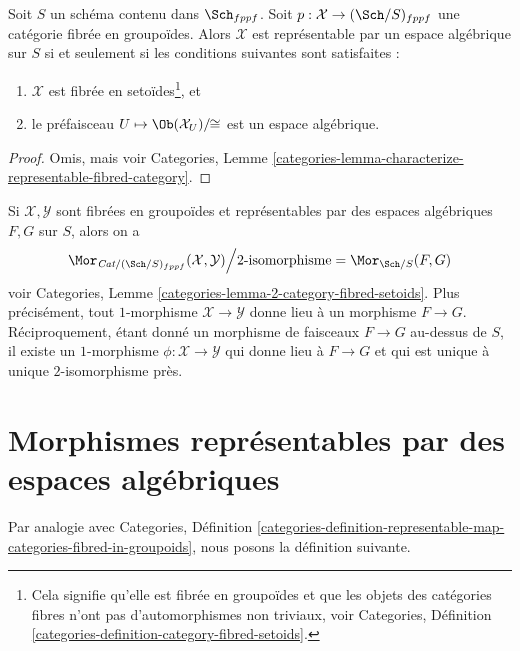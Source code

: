 \begin{lemma}
\label{lemma-characterize-representable-by-space}
Soit $S$ un schéma contenu dans $\Sch_{fppf}$.
Soit $p : \mathcal{X} \to (\Sch/S)_{fppf}$
une catégorie fibrée en groupoïdes.
Alors $\mathcal{X}$ est représentable par un espace algébrique sur $S$
si et seulement si les conditions suivantes sont satisfaites :
\begin{enumerate}
\item $\mathcal{X}$ est fibrée en setoïdes\footnote{Cela signifie qu'elle
est fibrée en groupoïdes et que les objets des catégories fibres
n'ont pas d'automorphismes non triviaux, voir Categories,
Définition \ref{categories-definition-category-fibred-setoids}.}, et
\item le préfaisceau $U \mapsto \Ob(\mathcal{X}_U)/\!\!\cong$ est
un espace algébrique.
\end{enumerate}
\end{lemma}

\begin{proof}
Omis, mais voir Categories,
Lemme \ref{categories-lemma-characterize-representable-fibred-category}.
\end{proof}

\noindent
Si $\mathcal{X}, \mathcal{Y}$ sont fibrées en groupoïdes et
représentables par des espaces algébriques $F, G$ sur $S$, alors on a
\begin{equation}
\label{equation-morphisms-spaces}
\Mor_{\textit{Cat}/(\Sch/S)_{fppf}}(\mathcal{X}, \mathcal{Y})
\Big/
2\text{-isomorphisme}
=
\Mor_{\Sch/S}(F, G)
\end{equation}
voir
Categories, Lemme \ref{categories-lemma-2-category-fibred-setoids}.
Plus précisément, tout $1$-morphisme $\mathcal{X} \to \mathcal{Y}$
donne lieu à un morphisme $F \to G$. Réciproquement, étant donné un morphisme
de faisceaux $F \to G$ au-dessus de $S$, il existe un $1$-morphisme
$\phi : \mathcal{X} \to \mathcal{Y}$ qui donne lieu à $F \to G$
et qui est unique à unique $2$-isomorphisme près.



\section{Morphismes représentables par des espaces algébriques}
\label{section-morphisms-representable-by-algebraic-spaces}

\noindent
Par analogie avec Categories, Définition
\ref{categories-definition-representable-map-categories-fibred-in-groupoids},
nous posons la définition suivante.

